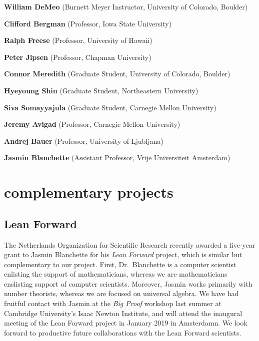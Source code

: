 \documentclass[11pt]{amsart}  %
\begin{document}
\vskip2mm
\hskip4.7mm {\bf William DeMeo} (Burnett Meyer Instructor, University of Colorado, Boulder)

\vskip5mm


\vskip2mm
\hskip4.7mm {\bf Clifford Bergman} (Professor, Iowa State University)

\vskip2mm
\hskip4.7mm {\bf Ralph Freese} (Professor, University of Hawaii)

\vskip2mm
\hskip4.7mm {\bf Peter Jipsen} (Professor, Chapman University)

\vskip2mm
\hskip4.7mm {\bf Connor Meredith} (Graduate Student, University of Colorado, Boulder)

\vskip2mm
\hskip4.7mm {\bf Hyeyoung Shin} (Graduate Student, Northeastern University)

\vskip2mm
\hskip4.7mm {\bf Siva Somayyajula} (Graduate Student, Carnegie Mellon University)



\vskip5mm


\vskip2mm
\hskip4.7mm {\bf Jeremy Avigad} (Professor, Carnegie Mellon University)

\vskip2mm
\hskip4.7mm {\bf Andrej Bauer} (Professor, University of Ljubljana)

\vskip2mm
\hskip4.7mm {\bf Jasmin Blanchette} (Assistant Professor, Vrije Universiteit Amsterdam)


  


\newpage







\section{complementary projects}

\subsection{Lean Forward}
The Netherlands Organization for Scientific Research recently awarded a five-year grant to Jasmin Blanchette for his \emph{Lean Forward} project, which is similar but complementary to our project. First, Dr.~Blanchette is a computer scientist enlisting the support of mathematicians, whereas we are mathematicians enslisting support of computer scientists.  
Moreover, Jasmin works primarily with number theorists, whereas we are focused on universal algebra. We have had fruitful contact with Jasmin at the \emph{Big Proof} workshop last summer at Cambridge University's Isaac Newton Institute, and will attend the inaugural meeting of the Lean Forward project in January 2019 in Amsterdamn. We look forward to productive future collaborations with the Lean Forward scientists.
\end{document}
